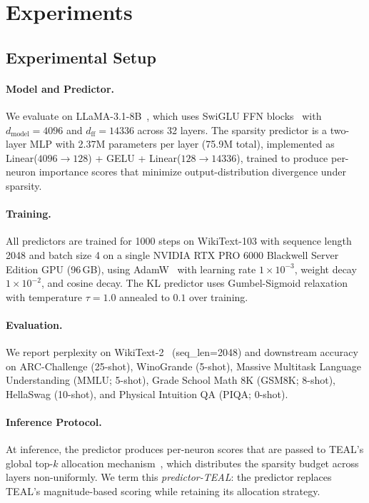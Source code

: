 \section{Experiments}
\label{sec:experiments}

\subsection{Experimental Setup}

\paragraph{Model and Predictor.}
We evaluate on LLaMA-3.1-8B~\cite{grattafiori2024llama3}, which uses SwiGLU FFN blocks~\cite{shazeer2020glu} with $d_{\text{model}}=4096$ and $d_{\text{ff}}=14336$ across 32 layers.
The sparsity predictor is a two-layer MLP with 2.37M parameters per layer (75.9M total), implemented as Linear($4096 \to 128$) + GELU + Linear($128 \to 14336$), trained to produce per-neuron importance scores that minimize output-distribution divergence under sparsity.

\paragraph{Training.}
All predictors are trained for 1000 steps on WikiText-103 with sequence length 2048 and batch size 4 on a single NVIDIA RTX PRO 6000 Blackwell Server Edition GPU (96\,GB), using AdamW~\cite{loshchilov2019adamw} with learning rate $1 \times 10^{-3}$, weight decay $1 \times 10^{-2}$, and cosine decay.
The KL predictor uses Gumbel-Sigmoid relaxation~\cite{jang2017gumbel} with temperature $\tau=1.0$ annealed to $0.1$ over training.

\paragraph{Evaluation.}
We report perplexity on WikiText-2~\cite{merity2017pointer} (seq\_len=2048) and downstream accuracy on ARC-Challenge (25-shot), WinoGrande (5-shot), Massive Multitask Language Understanding (MMLU; 5-shot), Grade School Math 8K (GSM8K; 8-shot), HellaSwag (10-shot), and Physical Intuition QA (PIQA; 0-shot).

\paragraph{Inference Protocol.}
At inference, the predictor produces per-neuron scores that are passed to TEAL's global top-$k$ allocation mechanism~\cite{liu2025teal}, which distributes the sparsity budget across layers non-uniformly.
We term this \textit{predictor-TEAL}: the predictor replaces TEAL's magnitude-based scoring while retaining its allocation strategy.

